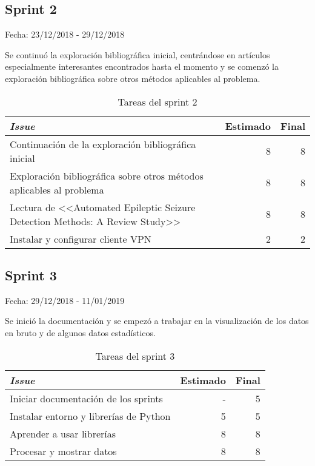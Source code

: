 \subsection{Sprint 2}

Fecha: 23/12/2018 - 29/12/2018

Se continuó la exploración bibliográfica inicial, centrándose en artículos especialmente interesantes encontrados hasta el momento y se comenzó la exploración bibliográfica sobre otros métodos aplicables al problema. 

\begin{table}[H]
	\begin{tabularx}{\textwidth}{Xrr}
		\toprule \textbf{\textit{Issue}} & \textbf{Estimado} & \textbf{Final}\\
		\toprule
		Continuación de la exploración bibliográfica inicial & 8 & 8 \\
		Exploración bibliográfica sobre otros métodos aplicables al problema & 8 & 8 \\
		Lectura de <<Automated Epileptic Seizure Detection Methods: A Review Study>> & 8 & 8 \\
		Instalar y configurar cliente VPN & 2 & 2 \\
		\bottomrule
	\end{tabularx}
	\caption{Tareas del sprint 2}
\end{table}

\subsection{Sprint 3}

Fecha: 29/12/2018 - 11/01/2019

Se inició la documentación y se empezó a trabajar en la visualización de los datos en bruto y de algunos datos estadísticos.

\begin{table}[H]
	\begin{tabularx}{\textwidth}{Xrr}
		\toprule \textbf{\textit{Issue}} & \textbf{Estimado} & \textbf{Final}\\
		\toprule 
		Iniciar documentación de los sprints & - & 5 \\
		Instalar entorno y librerías de Python & 5 & 5 \\
		Aprender a usar librerías & 8 & 8 \\
		Procesar y mostrar datos & 8 & 8 \\
		\bottomrule
	\end{tabularx}
	\caption{Tareas del sprint 3}
\end{table}

